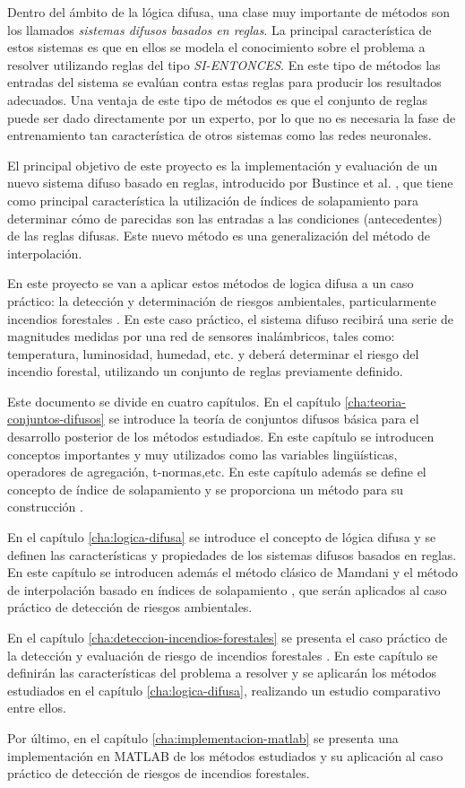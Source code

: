 Dentro del ámbito de la lógica difusa, una clase muy importante de métodos son los llamados \emph{sistemas difusos basados en reglas}. La principal característica de estos sistemas es que en ellos se modela el conocimiento sobre el problema a resolver utilizando reglas del tipo \emph{SI-ENTONCES}. En este tipo de métodos las entradas del sistema se evalúan contra estas reglas para producir los resultados adecuados. Una ventaja de este tipo de métodos es que el conjunto de reglas puede ser dado directamente por un experto, por lo que no es necesaria la fase de entrenamiento tan característica de otros sistemas como las redes neuronales.

El principal objetivo de este proyecto es la implementación y evaluación de un nuevo sistema difuso basado en reglas, introducido por Bustince et al. \cite{bustince2013overlap}, que tiene como principal característica la utilización de índices de solapamiento para determinar cómo de parecidas son las entradas a las condiciones (antecedentes) de las reglas difusas. Este nuevo método es una generalización del método de interpolación.

En este proyecto se van a aplicar estos métodos de logica difusa a un caso práctico: la detección y determinación de riesgos ambientales, particularmente incendios forestales \cite{bolourchi2013}. En este caso práctico, el sistema difuso recibirá una serie de magnitudes medidas por una red de sensores inalámbricos, tales como: temperatura, luminosidad, humedad, etc. y deberá determinar el riesgo del incendio forestal, utilizando un conjunto de reglas previamente definido.

Este documento se divide en cuatro capítulos. En el capítulo \ref{cha:teoria-conjuntos-difusos} se introduce la teoría de conjuntos difusos básica para el desarrollo posterior de los métodos estudiados. En este capítulo se introducen conceptos importantes y muy utilizados como las variables lingüísticas, operadores de agregación, t-normas,etc. En este capítulo además se define el concepto de índice de solapamiento y se proporciona un método para su construcción \cite{bustince2013overlap}.

En el capítulo \ref{cha:logica-difusa} se introduce el concepto de lógica difusa y se definen las características y propiedades de los sistemas difusos basados en reglas. En este capítulo se introducen además el método clásico de Mamdani \cite{Mamdani1975} y el método de interpolación basado en índices de solapamiento \cite{bustince2013overlap}, que serán aplicados al caso práctico de detección de riesgos ambientales.

En el capítulo \ref{cha:deteccion-incendios-forestales} se presenta el caso práctico de la detección y evaluación de riesgo de incendios forestales \cite{bolourchi2013}. En este capítulo se definirán las características del problema a resolver y se aplicarán los métodos estudiados en el capítulo \ref{cha:logica-difusa}, realizando un estudio comparativo entre ellos.

Por último, en el capítulo \ref{cha:implementacion-matlab} se presenta una implementación en MATLAB de los métodos estudiados y su aplicación al caso práctico de detección de riesgos de incendios forestales.